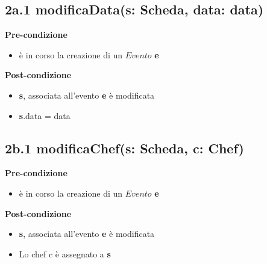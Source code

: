 \documentclass[12pt]{extarticle}
\begin{document}
\subsection*{2a.1 modificaData(s: Scheda, data: data)}

\textbf{Pre-condizione}
\begin{itemize}
  \item è in corso la creazione di un $Evento$ \textbf{e}
\end{itemize} 
\textbf{Post-condizione}
\begin{itemize}
  \item \textbf{s}, associata all'evento \textbf{e} è modificata
  \item \textbf{s}.data = data
\end{itemize} 



\subsection*{2b.1 modificaChef(s: Scheda, c: Chef)}

\textbf{Pre-condizione}
\begin{itemize}
  \item è in corso la creazione di un $Evento$ \textbf{e}
\end{itemize} 
\textbf{Post-condizione}
\begin{itemize}
  \item \textbf{s}, associata all'evento \textbf{e} è modificata
  \item Lo chef c è assegnato a \textbf{s}
\end{itemize} 
\end{document}
